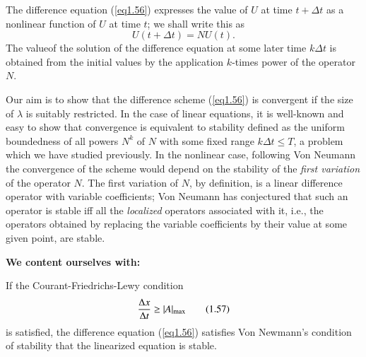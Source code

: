 The difference equation (\ref{eq1.56}) expresses the value of $U$ at time $t + \Delta t$ as a nonlinear function of $U$ at time $t$; we shall write this as
\begin{equation*}
U(t + \Delta t) = N U(t).
\tag*{$(1.56)'$}\label{eq1.56'}
\end{equation*}
The value\pageoriginale of the solution of the difference equation at some later time $k\Delta t$ is obtained from the initial values by the application $k$-times power of the operator $N$.

Our aim is to show that the difference scheme (\ref{eq1.56}) is convergent if the size of $\lambda$ is suitably restricted. In the case of linear equations, it is well-known and easy to show that convergence is equivalent to stability defined as the uniform boundedness of all powers $N^k$ of $N$ with some fixed range $k\Delta t \leq T$, a problem which we have studied previously. In the nonlinear case, following Von Neumann the convergence of the scheme would depend on the stability of the {\em first variation} of the operator $N$. The first variation of $N$, by definition, is a linear difference operator with variable coefficients; Von Neumann has conjectured that such an operator is stable iff all the {\em localized} operators associated with it, i.e., the operators obtained by replacing the variable coefficients by their value at some given point, are stable. 

\medskip
{\textbf{We content ourselves with: }}

\begin{theorem*}
If the Courant-Friedrichs-Lewy condition
\begin{equation*} 
\frac{\Delta x}{\Delta t} \geq |A|_{\rm max} \tag{1.57}\label{eq1.57}
\end{equation*}
is satisfied, the difference equation (\ref{eq1.56}) satisfies Von Newmann's condition of stability that the linearized equation is stable.
\end{theorem*}

